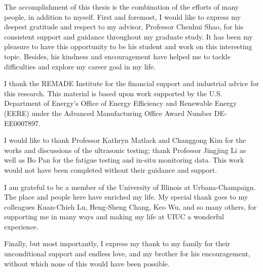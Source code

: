 The accomplishment of this thesis is the combination of the efforts of many people, in addition to myself. First and foremost, I would like to express my deepest gratitude and respect to my advisor, Professor Chenhui Shao, for his consistent support and guidance throughout my graduate study. It has been my pleasure to have this opportunity to be his student and work on this interesting topic. Besides, his kindness and encouragement have helped me to tackle difficulties and explore my career goal in my life.

I thank the REMADE Institute for the financial support and industrial advice for this research. This material is based upon work supported by the U.S. Department of Energy’s Office of Energy Efficiency and Renewable Energy (EERE) under the Advanced Manufacturing Office Award Number DE-EE0007897.

I would like to thank Professor Kathryn Matlack and Changgong Kim for the works and discussions of the ultrasonic testing; thank Professor Jingjing Li as well as Bo Pan for the fatigue testing and in-situ monitoring data. This work would not have been completed without their guidance and support.

I am grateful to be a member of the University of Illinois at Urbana-Champaign. The place and people here have enriched my life. My special thank goes to my colleagues Kuan-Chieh Lu, Heng-Sheng Chang, Keo Wu, and so many others, for supporting me in many ways and making my life at UIUC a wonderful experience.

Finally, but most importantly, I express my thank to my family for their unconditional support and endless love, and my brother for his encouragement, without which none of this would have been possible.